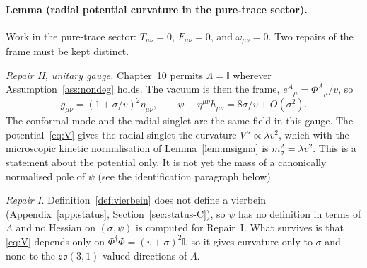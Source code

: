 \paragraph{Lemma (radial potential curvature in the pure-trace sector).}
\label{lem:psi-sigma}
Work in the pure-trace sector: \(T_{\mu\nu}=0\), \(F_{\mu\nu}=0\),
and \(\omega_{\mu\nu}=0\). Two repairs of the frame must be
kept distinct.

\emph{Repair II, unitary gauge.}
Chapter~10 permits \(\Lambda=\mathbb{I}\) wherever
Assumption~\ref{ass:nondeg} holds. The vacuum is then the frame,
\(e^{A}{}_{\mu}=\Phi^{A}{}_{\mu}/v\), so
\begin{equation}
  \label{eq:repairII-trace}
  g_{\mu\nu}
  =(1+\sigma/v)^{2}\eta_{\mu\nu},
  \qquad
  \psi
  \equiv\eta^{\mu\nu}h_{\mu\nu}
  =8\sigma/v+O(\sigma^{2}).
\end{equation}
The conformal mode and the radial singlet are the same field in
this gauge. The potential~\eqref{eq:V} gives the radial singlet the
curvature \(V''\propto\lambda v^{2}\), which with the microscopic
kinetic normalisation of Lemma~\ref{lem:msigma} is
\(m_\sigma^{2}=\lambda v^{2}\). This is a statement about the potential
only. It is not yet the mass of a canonically normalised pole of
\(\psi\) (see the identification paragraph below).

\emph{Repair I.}
Definition~\ref{def:vierbein} does not define a vierbein
(Appendix~\ref{app:status}, Section~\ref{sec:status-C}), so \(\psi\)
has no definition in terms of \(\Lambda\) and no Hessian on
\((\sigma,\psi)\) is computed for Repair~I. What survives is that
\eqref{eq:V} depends only on
\(\Phi^{\dagger}\Phi=(v+\sigma)^{2}\mathbb{I}\), so it gives
curvature only to \(\sigma\) and none to the
\(\mathfrak{so}(3,1)\)-valued directions of \(\Lambda\).

